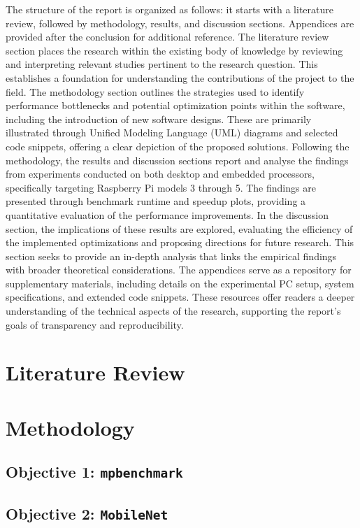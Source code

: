 \documentclass[12pt]{article}
\begin{document}
The structure of the report is organized as follows: it starts with a literature review, followed by methodology, results, and discussion sections. Appendices are provided after the conclusion for additional reference. The literature review section places the research within the existing body of knowledge by reviewing and interpreting relevant studies pertinent to the research question. This establishes a foundation for understanding the contributions of the project to the field. The methodology section outlines the strategies used to identify performance bottlenecks and potential optimization points within the software, including the introduction of new software designs. These are primarily illustrated through Unified Modeling Language (UML) diagrams and selected code snippets, offering a clear depiction of the proposed solutions. Following the methodology, the results and discussion sections report and analyse the findings from experiments conducted on both desktop and embedded processors, specifically targeting Raspberry Pi models 3 through 5. The findings are presented through benchmark runtime and speedup plots, providing a quantitative evaluation of the performance improvements. In the discussion section, the implications of these results are explored, evaluating the efficiency of the implemented optimizations and proposing directions for future research. This section seeks to provide an in-depth analysis that links the empirical findings with broader theoretical considerations. The appendices serve as a repository for supplementary materials, including details on the experimental PC setup, system specifications, and extended code snippets. These resources offer readers a deeper understanding of the technical aspects of the research, supporting the report's goals of transparency and reproducibility. 

\newpage
\section{Literature Review}
\section{Methodology}

\subsection{Objective 1: \texttt{mpbenchmark}}
\subsection{Objective 2: \texttt{MobileNet}}
\end{document}
